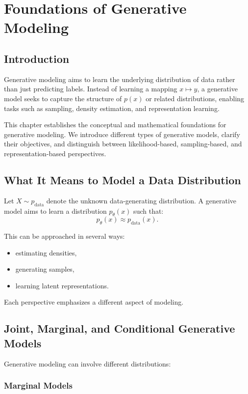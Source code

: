 \chapter{Foundations of Generative Modeling}

\section{Introduction}

Generative modeling aims to learn the underlying distribution of data rather than just predicting labels. Instead of learning a mapping $x \mapsto y$, a generative model seeks to capture the structure of $p(x)$ or related distributions, enabling tasks such as sampling, density estimation, and representation learning.

This chapter establishes the conceptual and mathematical foundations for generative modeling. We introduce different types of generative models, clarify their objectives, and distinguish between likelihood-based, sampling-based, and representation-based perspectives.

\section{What It Means to Model a Data Distribution}

Let $X \sim p_{\text{data}}$ denote the unknown data-generating distribution. A generative model aims to learn a distribution $p_\theta(x)$ such that:
\[
p_\theta(x) \approx p_{\text{data}}(x).
\]

This can be approached in several ways:
\begin{itemize}
    \item estimating densities,
    \item generating samples,
    \item learning latent representations.
\end{itemize}

Each perspective emphasizes a different aspect of modeling.

\section{Joint, Marginal, and Conditional Generative Models}

Generative modeling can involve different distributions:

\subsection{Marginal Models}

